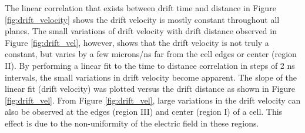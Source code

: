 \documentclass[journal, a4paper]{IEEEtran}
\begin{document}
The linear correlation that exists between drift time and distance in Figure \ref{fig:drift_velocity} shows
the drift velocity is mostly constant throughout all planes. The small variations of drift velocity with drift
distance observed in Figure \ref{fig:drift_vel}, however, shows that the drift velocity is not truly a constant,
but varies by a few microns/ns far from the cell edges or center (region II). By performing a linear fit to
the time to distance correlation in steps of 2 ns intervals, the small variations in drift velocity become apparent. The slope
of the linear fit (drift velocity) was plotted versus the drift distance as shown in Figure \ref{fig:drift_vel}.
From Figure \ref{fig:drift_vel}, large variations in the drift velocity can also be observed  at the edges (region III)
and center (region I) of a cell. This effect is due to the non-uniformity of the electric field in these regions.
\end{document}
